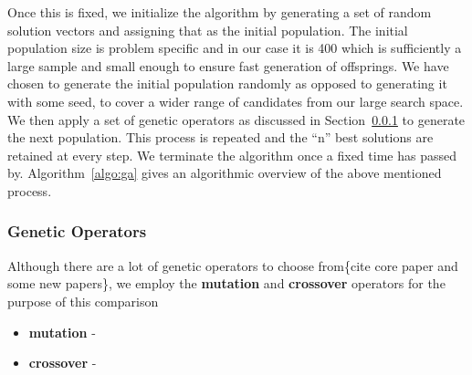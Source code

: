 Once this is fixed, we initialize the algorithm by generating a set of random solution vectors and assigning that as the initial population. The initial population size is problem specific and in our case it is 400 which is sufficiently a large sample and small enough to ensure fast generation of offsprings. We have chosen to generate the initial population randomly as opposed to generating it with some seed, to cover a wider range of candidates from our large search space. We then apply a set of genetic operators as discussed in Section~\ref{sec:gene-oper} to generate the next population. This process is repeated and the ``n'' best solutions are retained at every step. We terminate the algorithm once a fixed time has passed by. Algorithm~\ref{algo:ga} gives an algorithmic overview of the above mentioned process.

\subsubsection{Genetic Operators}
\label{sec:gene-oper}
Although there are a lot of genetic operators to choose from\{cite core paper and some new papers\}, we employ the \textbf{mutation} and \textbf{crossover} operators for the purpose of this comparison
\begin{itemize}
	\item \textbf{mutation} - 
	\item \textbf{crossover} - 
\end{itemize}